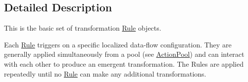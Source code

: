 \subsection{Detailed Description}
This is the basic set of transformation \mbox{\hyperlink{class_rule}{Rule}} objects. 

Each \mbox{\hyperlink{class_rule}{Rule}} triggers on a specific localized data-\/flow configuration. They are generally applied simultaneously from a pool (see \mbox{\hyperlink{class_action_pool}{Action\+Pool}}) and can interact with each other to produce an emergent transformation. The Rules are applied repeatedly until no \mbox{\hyperlink{class_rule}{Rule}} can make any additional transformations. 
